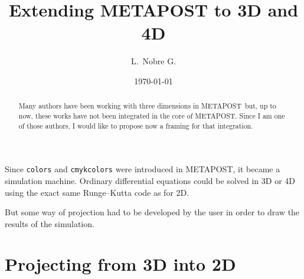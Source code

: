\documentclass{article}
\newcommand{\MP}{{\normald METAPOST}}
\begin{document}
\title{Extending {\biglogo METAPOST} to 3D and 4D}
\author{L.\ Nobre G.}
\date{\today}
\maketitle
\begin{abstract}
Many authors have been working with three dimensions in \MP\ but, up
to now, these works have not been integrated in the core of \MP. Since
I am one of those authors, I would like to propose now a framing for
that integration. 
\end{abstract}
\setlength{\columnsep}{2.5em}
\begin{multicols}{2}
\tableofcontents
\end{multicols}
Since {\tt colors} and {\tt cmykcolors} were introduced in \MP, it
became a simulation machine. Ordinary differential equations could be
solved in 3D or 4D using the exact same Runge--Kutta code as for 2D.

But some way of projection had to be developed by the user in order to
draw the results of the simulation. 

\section{Projecting from 3D into 2D}
\end{document}
